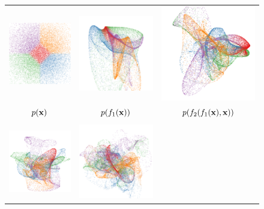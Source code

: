 \documentclass{article}
\begin{document}
\begin{figure}
\centering
\begin{tabular}{ccc}
\includegraphics[width=0.3\columnwidth]{figures/deep_draws/deep_gp_sample_layer_1} &
\includegraphics[width=0.3\columnwidth]{figures/deep_draws_connected/deep_sample_connected_layer2} &
\includegraphics[width=0.3\columnwidth]{figures/deep_draws_connected/deep_sample_connected_layer3} \\
$p({\bf{x}})$ & $p(f_1({\bf{x}}))$ & $p(f_2(f_1({\bf{x}}), {\bf{x}}))$ \\ \\
\includegraphics[width=0.3\columnwidth]{figures/deep_draws_connected/deep_sample_connected_layer4} &
\includegraphics[width=0.3\columnwidth]{figures/deep_draws_connected/deep_sample_connected_layer5} &

\end{tabular}
\end{figure}
\end{document}
